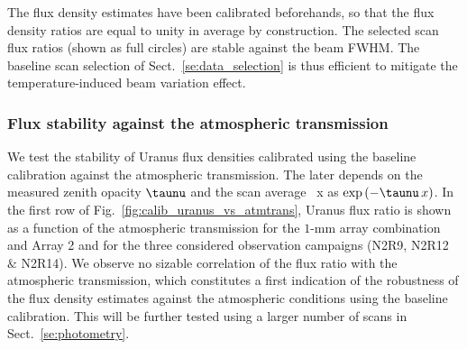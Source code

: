The flux density estimates have been calibrated beforehands, so that
the flux density ratios are equal to unity in average by construction.
The selected scan flux ratios (shown as full circles) are stable
against the beam FWHM. The baseline scan selection of
Sect.~\ref{se:data_selection} is thus efficient to mitigate the
temperature-induced beam variation effect.


\subsubsection{Flux stability against the atmospheric transmission}
\label{se:baseline_calibration_atm}

We test the stability of Uranus flux densities calibrated using the
baseline calibration against the atmospheric transmission. The later
depends on the measured zenith opacity $\taunu$ and the scan
average \airmass\ x as $\exp{(-\taunu \, x)}$. In
the first row of Fig.~\ref{fig:calib_uranus_vs_atmtrans}, Uranus flux ratio
is shown as a function of the atmospheric
transmission for the $1$-mm array combination and Array 2 and for the
three considered observation campaigns (N2R9, N2R12 $\&$ N2R14). We
observe no sizable correlation of the flux ratio with the atmospheric
transmission, which constitutes a first
indication of the robustness of the flux density estimates against the
atmospheric conditions using the baseline calibration. This will be
further tested using a larger number of scans in Sect.~\ref{se:photometry}.
%
